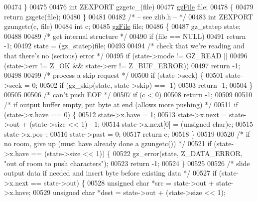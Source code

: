 \begin{DoxyCode}
00474 \}
00475 
00476 \textcolor{keywordtype}{int} ZEXPORT gzgetc\_(file)
00477 \hyperlink{structgz_file__s}{gzFile} file;
00478 \{
00479     \textcolor{keywordflow}{return} gzgetc(file);
00480 \}
00481 
00482 \textcolor{comment}{/* -- see zlib.h -- */}
00483 \textcolor{keywordtype}{int} ZEXPORT gzungetc(c, file)
00484     \textcolor{keywordtype}{int} c;
00485     \hyperlink{structgz_file__s}{gzFile} file;
00486 \{
00487     gz\_statep state;
00488 
00489     \textcolor{comment}{/* get internal structure */}
00490     \textcolor{keywordflow}{if} (file == NULL)
00491         \textcolor{keywordflow}{return} -1;
00492     state = (gz\_statep)file;
00493 
00494     \textcolor{comment}{/* check that we're reading and that there's no (serious) error */}
00495     \textcolor{keywordflow}{if} (state->mode != GZ\_READ ||
00496         (state->err != Z\_OK && state->err != Z\_BUF\_ERROR))
00497         \textcolor{keywordflow}{return} -1;
00498 
00499     \textcolor{comment}{/* process a skip request */}
00500     \textcolor{keywordflow}{if} (state->seek) \{
00501         state->seek = 0;
00502         \textcolor{keywordflow}{if} (gz\_skip(state, state->skip) == -1)
00503             \textcolor{keywordflow}{return} -1;
00504     \}
00505 
00506     \textcolor{comment}{/* can't push EOF */}
00507     \textcolor{keywordflow}{if} (c < 0)
00508         \textcolor{keywordflow}{return} -1;
00509 
00510     \textcolor{comment}{/* if output buffer empty, put byte at end (allows more pushing) */}
00511     \textcolor{keywordflow}{if} (state->x.have == 0) \{
00512         state->x.have = 1;
00513         state->x.next = state->out + (state->size << 1) - 1;
00514         state->x.next[0] = (\textcolor{keywordtype}{unsigned} char)c;
00515         state->x.pos--;
00516         state->past = 0;
00517         \textcolor{keywordflow}{return} c;
00518     \}
00519 
00520     \textcolor{comment}{/* if no room, give up (must have already done a gzungetc()) */}
00521     \textcolor{keywordflow}{if} (state->x.have == (state->size << 1)) \{
00522         gz\_error(state, Z\_DATA\_ERROR, \textcolor{stringliteral}{"out of room to push characters"});
00523         \textcolor{keywordflow}{return} -1;
00524     \}
00525 
00526     \textcolor{comment}{/* slide output data if needed and insert byte before existing data */}
00527     \textcolor{keywordflow}{if} (state->x.next == state->out) \{
00528         \textcolor{keywordtype}{unsigned} \textcolor{keywordtype}{char} *src = state->out + state->x.have;
00529         \textcolor{keywordtype}{unsigned} \textcolor{keywordtype}{char} *dest = state->out + (state->size << 1);

\end{DoxyCode}
